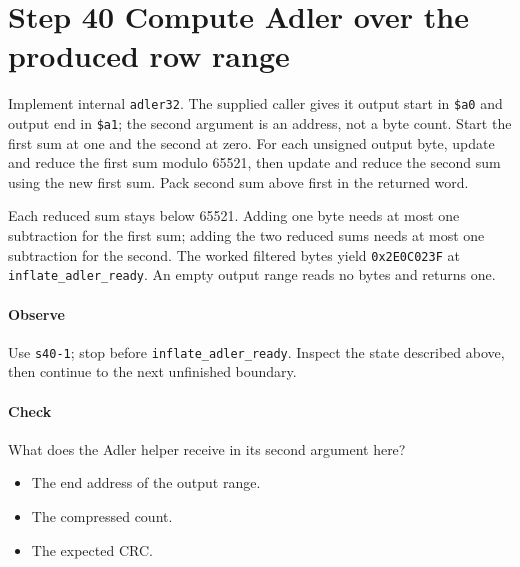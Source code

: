 \section{Step 40 Compute Adler over the produced row range}\label{png-inflate-s40}
Implement internal \texttt{adler32}. The supplied caller gives it output start in \texttt{\$a0} and output end in \texttt{\$a1}; the second argument is an address, not a byte count. Start the first sum at one and the second at zero. For each unsigned output byte, update and reduce the first sum modulo 65521, then update and reduce the second sum using the new first sum. Pack second sum above first in the returned word.

Each reduced sum stays below 65521. Adding one byte needs at most one subtraction for the first sum; adding the two reduced sums needs at most one subtraction for the second. The worked filtered bytes yield \texttt{0x2E0C023F} at \texttt{inflate\_adler\_ready}. An empty output range reads no bytes and returns one.

\paragraph{Observe} Use \texttt{s40-1}; stop before \texttt{inflate\_adler\_ready}. Inspect the state described above, then continue to the next unfinished boundary.

\paragraph{Check} What does the Adler helper receive in its second argument here?
\begin{itemize}
  \item[A.] The end address of the output range.
  \item[B.] The compressed count.
  \item[C.] The expected CRC.
\end{itemize}
